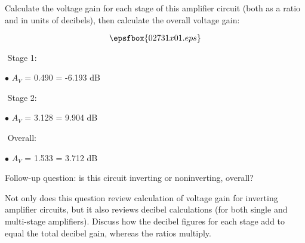 

Calculate the voltage gain for each stage of this amplifier circuit (both as a ratio and in units of decibels), then calculate the overall voltage gain:

$$\epsfbox{02731x01.eps}$$







\medskip
\goodbreak
\item{$ $} Stage 1:
\item{$\bullet$} $A_V$ = 0.490 = -6.193 dB
\medskip

\medskip
\goodbreak
\item{$ $} Stage 2:
\item{$\bullet$} $A_V$ = 3.128 = 9.904 dB
\medskip

\medskip
\goodbreak
\item{$ $} Overall:
\item{$\bullet$} $A_V$ = 1.533 = 3.712 dB
\medskip

\vskip 10pt

Follow-up question: is this circuit inverting or noninverting, overall?







Not only does this question review calculation of voltage gain for inverting amplifier circuits, but it also reviews decibel calculations (for both single and multi-stage amplifiers).  Discuss how the decibel figures for each stage add to equal the total decibel gain, whereas the ratios multiply.




